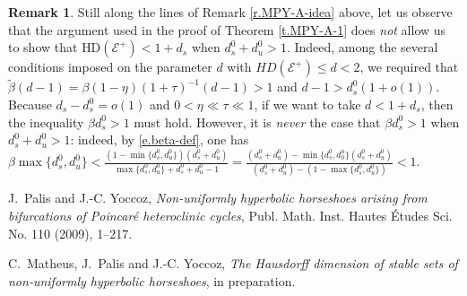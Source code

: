 \documentclass[12pt]{amsart}
\numberwithin{equation}{section}
\theoremstyle{definition}
\newtheorem{remark}[theorem]{Remark}
\newcommand{\<}{{\langle}}
\renewcommand{\>}{{\rangle}}
\begin{document}
\begin{remark}\label{r.expected-dimension-MPY-A} Still along the lines of Remark \ref{r.MPY-A-idea} above, let us observe that the argument used in the proof of Theorem \ref{t.MPY-A-1} does \emph{not} allow us to show that $\textrm{HD}(\mathcal{E}^+)<1+d_s$ when $d_s^0+d_u^0>1$. Indeed, among the several conditions imposed on the parameter $d$ with $HD(\mathcal{E}^+)\leq d<2$, we required that $\widetilde{\beta}(d-1)=\beta(1-\eta)(1+\tau)^{-1}(d-1)>1$ and $d-1>d_s^0(1+o(1))$. Because $d_s-d_s^0=o(1)$ and $0<\eta\ll\tau\ll1$, if we want to take $d<1+d_s$, then the inequality $\beta d_s^0>1$ must hold. However, it is \emph{never} the case that $\beta d_s^0>1$ when $d_s^0+d_u^0>1$: indeed, by \eqref{e.beta-def}, one has $\beta \max\{d_s^0,d_u^0\}<\frac{(1-\min\{d_s^0,d_u^0\})(d_s^0+d_u^0)}{\max\{d_s^0,d_u^0\}+d_s^0+d_u^0-1} = \frac{(d_s^0+d_u^0)-\min\{d_s^0,d_0^u\}(d_s^0+d_u^0)}{(d_s^0+d_u^0)-(1-\max\{d_s^0,d_u^0\})}<1$. 
\end{remark}

\begin{thebibliography}{99}

 J.~Palis and J.-C. Yoccoz, 
\emph{Non-uniformly hyperbolic horseshoes arising from bifurcations of Poincar\'e heteroclinic cycles},
Publ. Math. Inst. Hautes \'Etudes Sci. No. 110 (2009), 1--217.

 C.~Matheus, J.~Palis and J.-C. Yoccoz, 
\emph{The Hausdorff dimension of stable sets of non-uniformly hyperbolic horseshoes}, in preparation. 

\end{thebibliography}
\end{document}
